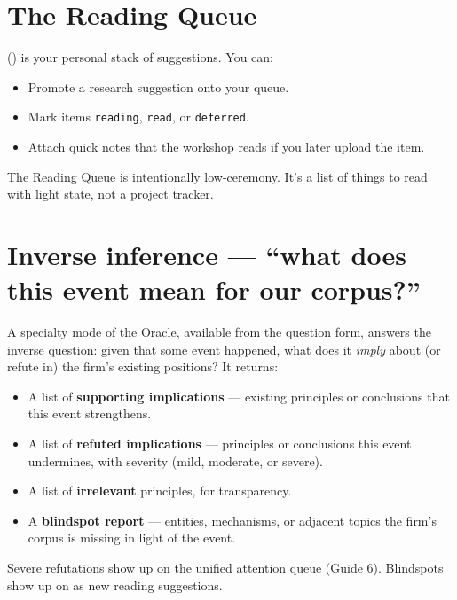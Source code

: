 \documentclass[11pt]{article}
\begin{document}
\section{The Reading Queue}

 () is your personal stack
of suggestions. You can:

\begin{itemize}[leftmargin=*,itemsep=0.2em]
  \item Promote a research suggestion onto your queue.
  \item Mark items \texttt{reading}, \texttt{read}, or
        \texttt{deferred}.
  \item Attach quick notes that the workshop reads if you later upload
        the item.
\end{itemize}

The Reading Queue is intentionally low-ceremony. It's a list of things
to read with light state, not a project tracker.

\section{Inverse inference --- ``what does this event mean for our corpus?''}

A specialty mode of the Oracle, available from the question form,
answers the inverse question: given that some event happened, what
does it \emph{imply} about (or refute in) the firm's existing
positions? It returns:

\begin{itemize}[leftmargin=*,itemsep=0.2em]
  \item A list of \textbf{supporting implications} --- existing
        principles or conclusions that this event strengthens.
  \item A list of \textbf{refuted implications} --- principles or
        conclusions this event undermines, with severity (mild,
        moderate, or severe).
  \item A list of \textbf{irrelevant} principles, for transparency.
  \item A \textbf{blindspot report} --- entities, mechanisms, or
        adjacent topics the firm's corpus is missing in light of the
        event.
\end{itemize}

Severe refutations show up on the unified attention queue (Guide 6).
Blindspots show up on  as new reading suggestions.
\end{document}
